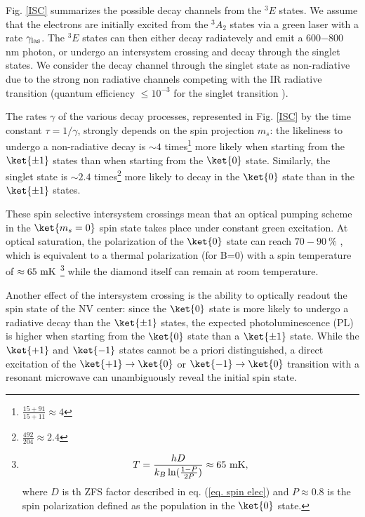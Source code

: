 \documentclass[a4paper,11pt]{report}
\begin{document}
\begin{refsection}
Fig. \ref{ISC} summarizes the possible decay channels from the $^3E$ states. We assume that the electrons are initially excited from the $^3A_2$ states via a green laser with a rate $\gamma_{\rm las}$. The $^3E$ states can then either decay radiatevely and emit a 600$-$800 nm photon, or undergo an intersystem crossing and decay through the singlet states. We consider the decay channel through the singlet state as non-radiative due to the strong non radiative channels competing with the IR radiative transition (quantum efficiency $\leq 10^{-3}$ for the singlet transition \citep{rogers2008infrared, ma2010excited, acosta2010optical}).

The rates $\gamma$ of the various decay processes, represented in Fig. \ref{ISC} by the time constant $\tau=1/\gamma$, strongly depends on the spin projection $m_s$: the likeliness to undergo a non-radiative decay is $\sim 4$ times\footnote{$\frac{15+91}{15+11}\approx 4$} more likely when starting from the $\ket{\pm 1}$ states than when starting from the $\ket{0}$ state. Similarly, the singlet state is $\sim 2.4$ times\footnote{$\frac{492}{204} \approx 2.4$} more likely to decay in the $\ket{0}$ state than in the $\ket{\pm 1}$ states.

These spin selective intersystem crossings mean that an optical pumping scheme in the $\ket{m_s=0}$ spin state takes place under constant green excitation. At optical saturation, the polarization of the $\ket{0}$ state can reach $70-90\ \%$ \citep{gupta2016efficient}, which is equivalent to a thermal polarization (for B=0) with a spin temperature of $\approx 65\ \rm mK$ \footnote{\begin{equation*}
T=\frac{h D}{k_B \ln (\frac{1-P}{2P})} \approx 65\ \rm mK,
\end{equation*}
where $D$ is th ZFS factor described in eq. (\ref{eq. spin elec}) and $P\approx 0.8$ is the spin polarization defined as the population in the $\ket{0}$ state.} while the diamond itself can remain at room temperature.

Another effect of the intersystem crossing is the ability to optically readout the spin state of the NV center: since the $\ket{0}$ state is more likely to undergo a radiative decay than the $\ket{\pm 1}$ states, the expected photoluminescence (PL) is higher when starting from the $\ket{0}$ state than a $\ket{\pm 1}$ state. While the $\ket{+1}$ and $\ket{-1}$ states cannot be a priori distinguished, a direct excitation of the $\ket{+1} \to \ket{0}$ or $\ket{-1} \to \ket{0}$ transition with a resonant microwave can unambiguously reveal the initial spin state.


\end{refsection}
\end{document}
